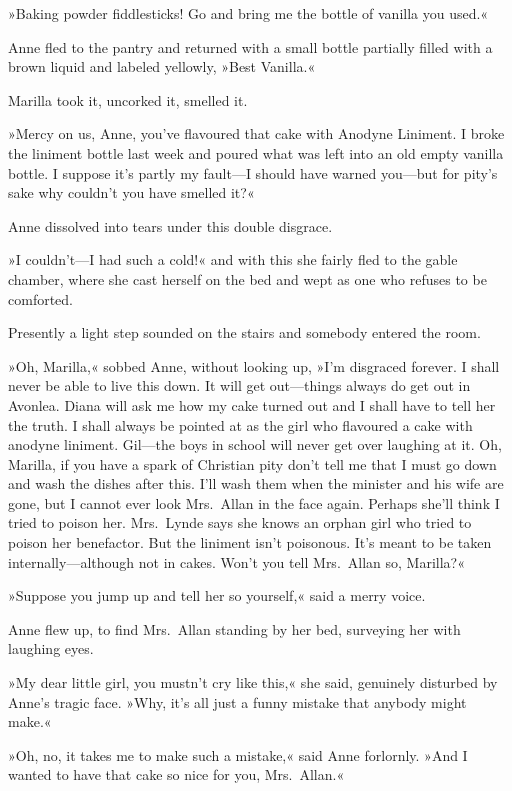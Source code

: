 »Baking powder fiddlesticks! Go and bring me the bottle of vanilla you used.«

Anne fled to the pantry and returned with a small bottle partially filled with a brown liquid and labeled yellowly, »Best Vanilla.«

Marilla took it, uncorked it, smelled it.

»Mercy on us, Anne, you've flavoured that cake with Anodyne Liniment. I broke the liniment bottle last week and poured what was left into an old empty vanilla bottle. I suppose it's partly my fault—I should have warned you—but for pity's sake why couldn't you have smelled it?«

Anne dissolved into tears under this double disgrace.

»I couldn't—I had such a cold!« and with this she fairly fled to the gable chamber, where she cast herself on the bed and wept as one who refuses to be comforted.

Presently a light step sounded on the stairs and somebody entered the room.

»Oh, Marilla,« sobbed Anne, without looking up, »I'm disgraced forever. I shall never be able to live this down. It will get out—things always do get out in Avonlea. Diana will ask me how my cake turned out and I shall have to tell her the truth. I shall always be pointed at as the girl who flavoured a cake with anodyne liniment. Gil—the boys in school will never get over laughing at it. Oh, Marilla, if you have a spark of Christian pity don't tell me that I must go down and wash the dishes after this. I'll wash them when the minister and his wife are gone, but I cannot ever look Mrs.~Allan in the face again. Perhaps she'll think I tried to poison her. Mrs.~Lynde says she knows an orphan girl who tried to poison her benefactor. But the liniment isn't poisonous. It's meant to be taken internally—although not in cakes. Won't you tell Mrs.~Allan so, Marilla?«

»Suppose you jump up and tell her so yourself,« said a merry voice.

Anne flew up, to find Mrs.~Allan standing by her bed, surveying her with laughing eyes.

»My dear little girl, you mustn't cry like this,« she said, genuinely disturbed by Anne's tragic face. »Why, it's all just a funny mistake that anybody might make.«

»Oh, no, it takes me to make such a mistake,« said Anne forlornly. »And I wanted to have that cake so nice for you, Mrs.~Allan.«

